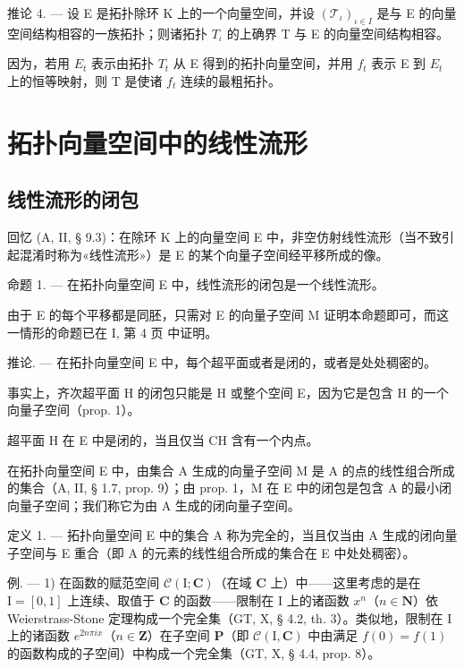 推论 4. --- 设 E 是拓扑除环 K 上的一个向量空间，并设 \((\mathcal{T}_{\iota})_{\iota\in I}\) 是与 E 的向量空间结构相容的一族拓扑；则诸拓扑 \(T_{\iota}\) 的上确界 T 与 E 的向量空间结构相容。

因为，若用 \(E_{t}\) 表示由拓扑 \(T_{t}\) 从 E 得到的拓扑向量空间，并用 \(f_{t}\) 表示 E 到 \(E_{t}\) 上的恒等映射，则 T 是使诸 \(f_{t}\) 连续的最粗拓扑。

\section{拓扑向量空间中的线性流形}

\subsection{线性流形的闭包}

回忆 (A, II, § 9.3)：在除环 K 上的向量空间 E 中，非空仿射线性流形（当不致引起混淆时称为«线性流形»）是 E 的某个向量子空间经平移所成的像。

命题 1. --- 在拓扑向量空间 E 中，线性流形的闭包是一个线性流形。

由于 E 的每个平移都是同胚，只需对 E 的向量子空间 M 证明本命题即可，而这一情形的命题已在 I, 第 4 页 中证明。

推论. --- 在拓扑向量空间 E 中，每个超平面或者是闭的，或者是处处稠密的。

事实上，齐次超平面 H 的闭包只能是 H 或整个空间 E，因为它是包含 H 的一个向量子空间（prop. 1）。

超平面 H 在 E 中是闭的，当且仅当 CH 含有一个内点。

在拓扑向量空间 E 中，由集合 A 生成的向量子空间 M 是 A 的点的线性组合所成的集合（A, II, § 1.7, prop. 9）；由 prop. 1，M 在 E 中的闭包是包含 A 的最小闭向量子空间；我们称它为由 A 生成的闭向量子空间。

定义 1. --- 拓扑向量空间 E 中的集合 A 称为完全的，当且仅当由 A 生成的闭向量子空间与 E 重合（即 A 的元素的线性组合所成的集合在 E 中处处稠密）。

例. --- 1) 在函数的赋范空间 \(\mathcal{C}(\mathrm{I};\mathbf{C})\)（在域 \(\mathbf{C}\) 上）中——这里考虑的是在 \(\mathrm{I} = [0,1]\) 上连续、取值于 \(\mathbf{C}\) 的函数——限制在 \(\mathrm{I}\) 上的诸函数 \(x^n\)（\(n\in \mathbf{N}\)）依 Weierstrass-Stone 定理构成一个完全集（GT, X, § 4.2, th. 3）。类似地，限制在 \(\mathrm{I}\) 上的诸函数 \(e^{2n\pi ix}\)（\(n\in \mathbf{Z}\)）在子空间 \(\mathbf{P}\)（即 \(\mathcal{C}(\mathrm{I},\mathbf{C})\) 中由满足 \(f(0) = f(1)\) 的函数构成的子空间）中构成一个完全集（GT, X, § 4.4, prop. 8）。

